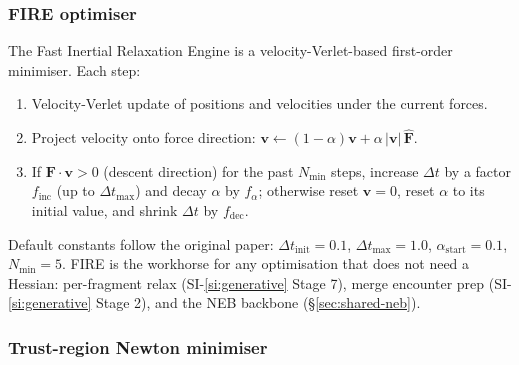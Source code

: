 \subsubsection{FIRE optimiser}
\label{sec:shared-fire}

The Fast Inertial Relaxation Engine \citep[][used force-only]{bitzek2006fire} is a velocity-Verlet-based first-order minimiser. Each step:
\begin{enumerate}
    \item Velocity-Verlet update of positions and velocities under the current forces.
    \item Project velocity onto force direction: $\mathbf{v} \leftarrow (1-\alpha)\mathbf{v} + \alpha\,|\mathbf{v}|\,\hat{\mathbf{F}}$.
    \item If $\mathbf{F} \cdot \mathbf{v} > 0$ (descent direction) for the past $N_\text{min}$ steps, increase $\Delta t$ by a factor $f_\text{inc}$ (up to $\Delta t_\text{max}$) and decay $\alpha$ by $f_\alpha$; otherwise reset $\mathbf{v} = 0$, reset $\alpha$ to its initial value, and shrink $\Delta t$ by $f_\text{dec}$.
\end{enumerate}
Default constants follow the original paper: $\Delta t_\text{init} = 0.1$, $\Delta t_\text{max} = 1.0$, $\alpha_\text{start} = 0.1$, $N_\text{min} = 5$. FIRE is the workhorse for any optimisation that does not need a Hessian: per-fragment relax (SI-\ref{si:generative} Stage 7), merge encounter prep (SI-\ref{si:generative} Stage 2), and the NEB backbone (\S\ref{sec:shared-neb}).


\subsubsection{Trust-region Newton minimiser}
\label{sec:shared-newton}

